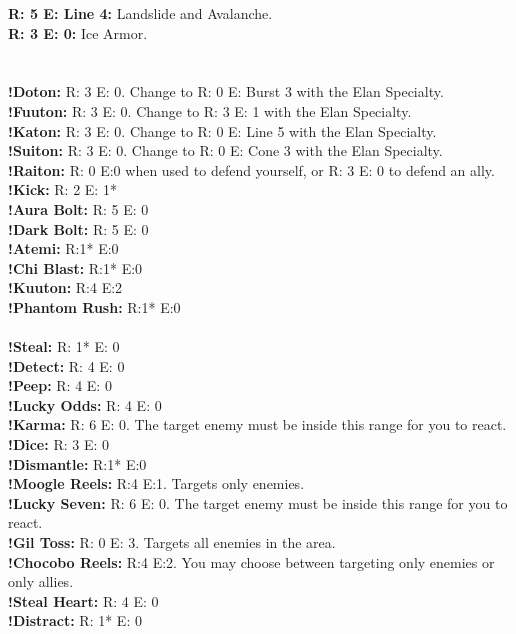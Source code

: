 \textbf{R: 5 E: Line 4:} Landslide and Avalanche.\\
\textbf{R: 3 E: 0:} Ice Armor.\\
%
\\\\
%
 \ofrow
\textbf{!Doton:} R: 3 E: 0. Change to R: 0 E: Burst 3 with the Elan Specialty.\\
\textbf{!Fuuton:} R: 3 E: 0. Change to R: 3 E: 1 with the Elan Specialty.\\
\textbf{!Katon:} R: 3 E: 0. Change to R: 0 E: Line 5 with the Elan Specialty.\\
\textbf{!Suiton:} R: 3 E: 0. Change to R: 0 E: Cone 3 with the Elan Specialty.\\
\textbf{!Raiton:} R: 0 E:0 when used to defend yourself, or R: 3 E: 0 to defend an ally.\\
\textbf{!Kick:} R: 2 E: 1*\\
\textbf{!Aura Bolt:} R: 5 E: 0\\
\textbf{!Dark Bolt:} R: 5 E: 0\\
\textbf{!Atemi:} R:1* E:0\\
\textbf{!Chi Blast:} R:1* E:0\\
\textbf{!Kuuton:} R:4 E:2\\
\textbf{!Phantom Rush:} R:1* E:0
%
\\\\
%
 \ofrow
\textbf{!Steal:} R: 1* E: 0\\
\textbf{!Detect:} R: 4 E: 0\\
\textbf{!Peep:} R: 4 E: 0\\
\textbf{!Lucky Odds:} R: 4 E: 0\\
\textbf{!Karma:} R: 6 E: 0. The target enemy must be inside this range for you to react.\\
\textbf{!Dice:} R: 3 E: 0\\
\textbf{!Dismantle:} R:1* E:0\\
\textbf{!Moogle Reels:} R:4 E:1. Targets only enemies.\\
\textbf{!Lucky Seven:} R: 6 E: 0. The target enemy must be inside this range for you to react.\\
\textbf{!Gil Toss:} R: 0 E: 3. Targets all enemies in the area.\\
\textbf{!Chocobo Reels:} R:4 E:2. You may choose between targeting only enemies or only allies.\\
\textbf{!Steal Heart:} R: 4 E: 0\\
\textbf{!Distract:} R: 1* E: 0
